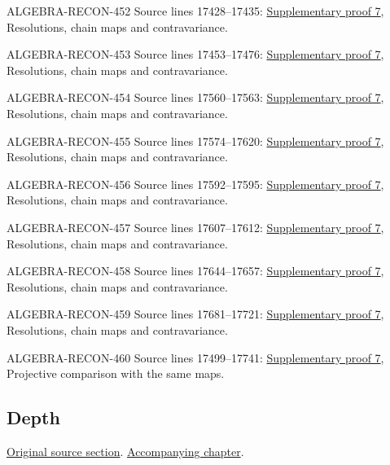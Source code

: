 \begin{AlgebraSourceRoutes}
\item[ALGEBRA-RECON-452] Source lines 17428--17435: \hyperlink{algebra_blowup_ext_depth_notes_20260927}{Supplementary proof 7}, Resolutions, chain maps and contravariance.
\item[ALGEBRA-RECON-453] Source lines 17453--17476: \hyperlink{algebra_blowup_ext_depth_notes_20260927}{Supplementary proof 7}, Resolutions, chain maps and contravariance.
\item[ALGEBRA-RECON-454] Source lines 17560--17563: \hyperlink{algebra_blowup_ext_depth_notes_20260927}{Supplementary proof 7}, Resolutions, chain maps and contravariance.
\item[ALGEBRA-RECON-455] Source lines 17574--17620: \hyperlink{algebra_blowup_ext_depth_notes_20260927}{Supplementary proof 7}, Resolutions, chain maps and contravariance.
\item[ALGEBRA-RECON-456] Source lines 17592--17595: \hyperlink{algebra_blowup_ext_depth_notes_20260927}{Supplementary proof 7}, Resolutions, chain maps and contravariance.
\item[ALGEBRA-RECON-457] Source lines 17607--17612: \hyperlink{algebra_blowup_ext_depth_notes_20260927}{Supplementary proof 7}, Resolutions, chain maps and contravariance.
\item[ALGEBRA-RECON-458] Source lines 17644--17657: \hyperlink{algebra_blowup_ext_depth_notes_20260927}{Supplementary proof 7}, Resolutions, chain maps and contravariance.
\item[ALGEBRA-RECON-459] Source lines 17681--17721: \hyperlink{algebra_blowup_ext_depth_notes_20260927}{Supplementary proof 7}, Resolutions, chain maps and contravariance.
\item[ALGEBRA-RECON-460] Source lines 17499--17741: \hyperlink{algebra_blowup_ext_depth_notes_20260927}{Supplementary proof 7}, Projective comparison with the same maps.
\end{AlgebraSourceRoutes}

\subsection{Depth}
\hypertarget{algebra-source-section-depth}{}
\noindent\href{https://github.com/stacks/stacks-project/blob/a04446e57ec1fbc252a871afcec7752fb2807b14/algebra.tex\#L17759}{Original source section}. \href{algebra.pdf\#nameddest=section-depth}{Accompanying chapter}.


